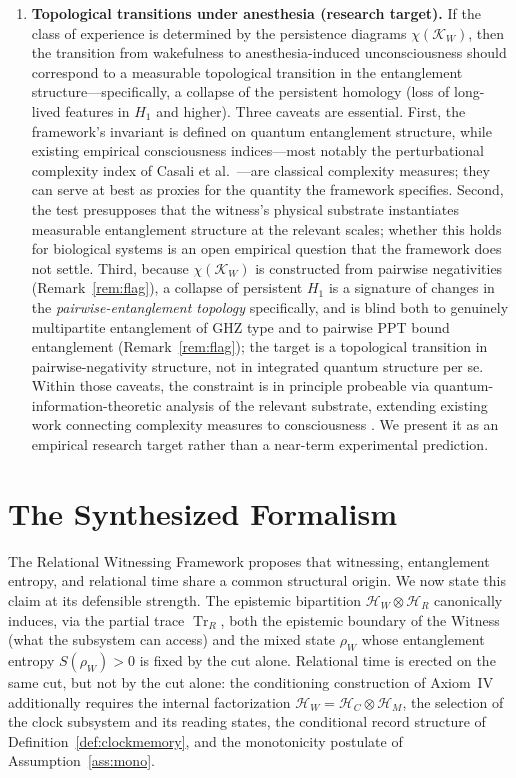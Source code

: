 \documentclass[11pt, a4paper]{article}
\begin{document}
\begin{enumerate}
    \item \textbf{Topological transitions under anesthesia (research target).} If the class of experience is determined by the persistence diagrams $\chi(\mathcal{K}_W)$, then the transition from wakefulness to anesthesia-induced unconsciousness should correspond to a measurable topological transition in the entanglement structure---specifically, a collapse of the persistent homology (loss of long-lived features in $H_1$ and higher). Three caveats are essential. First, the framework's invariant is defined on quantum entanglement structure, while existing empirical consciousness indices---most notably the perturbational complexity index of Casali et al.\ \cite{Casali2013}---are classical complexity measures; they can serve at best as proxies for the quantity the framework specifies. Second, the test presupposes that the witness's physical substrate instantiates measurable entanglement structure at the relevant scales; whether this holds for biological systems is an open empirical question that the framework does not settle. Third, because $\chi(\mathcal{K}_W)$ is constructed from pairwise negativities (Remark~\ref{rem:flag}), a collapse of persistent $H_1$ is a signature of changes in the \emph{pairwise-entanglement topology} specifically, and is blind both to genuinely multipartite entanglement of GHZ type and to pairwise PPT bound entanglement (Remark~\ref{rem:flag}); the target is a topological transition in pairwise-negativity structure, not in integrated quantum structure per se. Within those caveats, the constraint is in principle probeable via quantum-information-theoretic analysis of the relevant substrate, extending existing work connecting complexity measures to consciousness \cite{Casali2013}. We present it as an empirical research target rather than a near-term experimental prediction.
\end{enumerate}

\section{The Synthesized Formalism}
\label{sec:synthesis}

The Relational Witnessing Framework proposes that witnessing, entanglement entropy, and relational time share a common structural origin. We now state this claim at its defensible strength. The epistemic bipartition $\mathcal{H}_W \otimes \mathcal{H}_R$ canonically induces, via the partial trace $\operatorname{Tr}_R$, both the epistemic boundary of the Witness (what the subsystem can access) and the mixed state $\rho_W$ whose entanglement entropy $S(\rho_W) > 0$ is fixed by the cut alone. Relational time is erected on the same cut, but not by the cut alone: the conditioning construction of Axiom~IV additionally requires the internal factorization $\mathcal{H}_W = \mathcal{H}_C \otimes \mathcal{H}_M$, the selection of the clock subsystem and its reading states, the conditional record structure of Definition~\ref{def:clockmemory}, and the monotonicity postulate of Assumption~\ref{ass:mono}.
\end{document}
